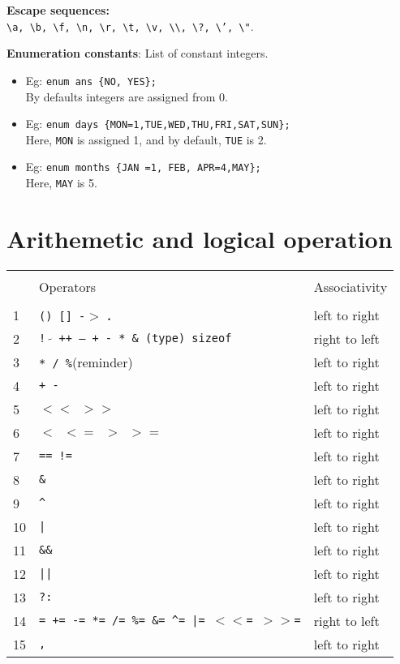 \begin{multicols*}{3}
\textbf{Escape sequences:}\\
 \texttt{\textbackslash a, \textbackslash b, \textbackslash f, \textbackslash n, \textbackslash r, \textbackslash t, \textbackslash v, \textbackslash \textbackslash, \textbackslash ?, \textbackslash ', \textbackslash "}.

\textbf{Enumeration constants}: List of constant integers.\\

\begin{itemize}
\item Eg: \texttt{enum ans \{NO, YES\};}\\
By defaults integers are assigned from 0.
\item Eg: \texttt{enum days \{MON=1,TUE,WED,THU,FRI,SAT,SUN\};}\\
Here, \texttt{MON} is assigned 1, and by default, \texttt{TUE} is 2. 
\item Eg: \texttt{enum months \{JAN =1, FEB, APR=4,MAY\};}\\
Here, \texttt{MAY} is 5.
\end{itemize}



\section{Arithemetic and logical operation}
\begin{tabularx}{\linewidth}{l|lX}
\hline\\
& Operators & Associativity \\
\hline \\
1 & \texttt{() [] -$>$} \textbf{.} & left to right\\
2 & \texttt{! $\tilde{}$ ++ -- + - * \& (type) sizeof} & right to left\\
3 & \texttt{* / \%}(reminder) & left to right\\
4 & \texttt{+ -} & left to right \\
5 & \texttt{$<<$ $>>$} & left to right \\
6 & \texttt{$<$ $<=$ $>$ $>=$}  & left to right\\
7 & \texttt{== !=} & left to right\\
8 & \texttt{\&} & left to right \\
9 & \texttt{\^} & left to right \\
10 & \texttt{|} & left to right\\
11 & \texttt{\&\&} & left to right\\
12 & \texttt{||} & left to right \\
13 & \texttt{?:} & left to right \\
14 & \texttt{= += -= *= /= \%= \&= \^{}= |= $<<$= $>>$=} & right to left\\
15 & \texttt{,} & left to right\\
\hline
\end{tabularx}


\end{multicols*}
